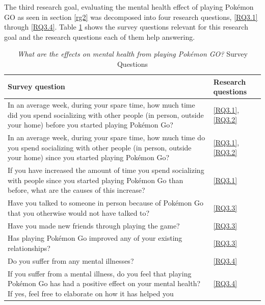The third research goal, evaluating the mental health effect of playing Pokémon GO as seen in section \ref{rg2} was decomposed into four research questions, \ref{RQ3.1} through \ref{RQ3.4}. Table \ref{tbl:rg3-survey-questions} shows the survey questions relevant for this research goal and the research questions each of them help answering.

\begin{table}[h]
	\caption{\emph{What are the effects on mental health from playing Pokémon GO?} Survey Questions}
	\centering
	\label{tbl:rg3-survey-questions}
	\begin{tabularx}{\textwidth}{|X|l|}
		\hline
		\textbf{Survey question} & \textbf{Research questions}\\
		\hline\hline
		
		In an average week, during your spare time, how much time did you spend socializing with other people (in person, outside your home) before you started playing Pokémon Go? & \ref{RQ3.1}, \ref{RQ3.2}\\
		\hline
		
		In an average week, during your spare time, how much time do you spend socializing with other people (in person, outside your home) since you started playing Pokémon Go? & \ref{RQ3.1}, \ref{RQ3.2}\\
		\hline
		
		If you have increased the amount of time you spend socializing with people since you started playing Pokémon Go than before, what are the causes of this increase? & \ref{RQ3.1}\\
		\hline
		
		Have you talked to someone in person because of Pokémon Go that you otherwise would not have talked to? & \ref{RQ3.3}\\
		\hline
		
		Have you made new friends through playing the game? & \ref{RQ3.3}\\
		\hline
		
		Has playing Pokémon Go improved any of your existing relationships? & \ref{RQ3.3}\\
		\hline
		
		Do you suffer from any mental illnesses? & \ref{RQ3.4}\\
		\hline
		
		If you suffer from a mental illness, do you feel that playing Pokémon Go has had a positive effect on your mental health? If yes, feel free to elaborate on how it has helped you & \ref{RQ3.4}\\
		\hline
	\end{tabularx}
\end{table}